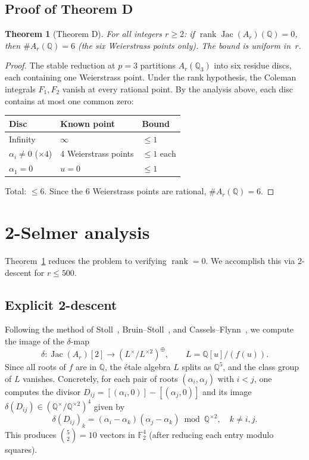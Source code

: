 \documentclass[11pt]{amsart}
\theoremstyle{plain}
\newtheorem{theorem}{Theorem}[section]
\theoremstyle{definition}
\theoremstyle{remark}
\newcommand{\QQ}{\mathbb{Q}}
\newcommand{\FF}{\mathbb{F}}
\newcommand{\Jac}{\operatorname{Jac}}
\newcommand{\rank}{\operatorname{rank}}
\begin{document}
\subsection{Proof of Theorem D}

\begin{theorem}[Theorem D]\label{thm:D}
For all integers $r\ge 2$: if\/ $\rank\Jac(A_r)(\QQ)=0$, then
$\#A_r(\QQ)=6$ (the six Weierstrass points only).
The bound is uniform in~$r$.
\end{theorem}

\begin{proof}
The stable reduction at $p=3$ partitions $A_r(\QQ_3)$ into six residue discs,
each containing one Weierstrass point.  Under the rank hypothesis, the Coleman
integrals $F_1,F_2$ vanish at every rational point.  By the analysis above,
each disc contains at most one common zero:
\begin{center}
\begin{tabular}{lll}
\toprule
Disc & Known point & Bound \\
\midrule
Infinity         & $\infty$                         & $\le 1$ \\
$\alpha_i\ne 0$ ($\times 4$) & 4 Weierstrass points & $\le 1$ each \\
$\alpha_1=0$     & $u=0$                            & $\le 1$ \\
\bottomrule
\end{tabular}
\end{center}
Total: $\le 6$.  Since the 6 Weierstrass points are rational, $\#A_r(\QQ)=6$.
\end{proof}


\section{2-Selmer analysis}\label{sec:selmer}

Theorem~\ref{thm:D} reduces the problem to verifying $\rank=0$.
We accomplish this via 2-descent for $r\le 500$.

\subsection{Explicit 2-descent}

Following the method of Stoll~\cite{Stoll2006,Stoll2017},
Bruin--Stoll~\cite{BruinStoll2010}, and Cassels--Flynn~\cite{CasselsFlynn},
we compute the image of the $\delta$-map
\[
  \delta\colon \Jac(A_r)[2]\longrightarrow (L^\times/L^{\times 2})^{\oplus},
  \qquad L=\QQ[u]/(f(u)).
\]
Since all roots of $f$ are in $\QQ$, the \'etale algebra $L$ splits as $\QQ^5$,
and the class group of $L$ vanishes.
Concretely, for each pair of roots $(\alpha_i,\alpha_j)$ with $i<j$,
one computes the divisor $D_{ij}=[(\alpha_i,0)]-[(\alpha_j,0)]$ and
its image $\delta(D_{ij})\in(\QQ^\times/\QQ^{\times 2})^4$ given by
\[
  \delta(D_{ij})_k = (\alpha_i-\alpha_k)(\alpha_j-\alpha_k)\bmod\QQ^{\times 2},
  \quad k\ne i,j.
\]
This produces $\binom{5}{2}=10$ vectors in $\FF_2^4$
(after reducing each entry modulo squares).
\end{document}
